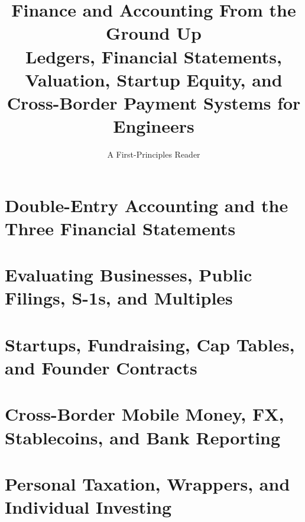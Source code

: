 \documentclass[11pt,oneside]{book}
\title{\textbf{Finance and Accounting From the Ground Up}\\[0.4em]
\large Ledgers, Financial Statements, Valuation, Startup Equity, and Cross-Border Payment Systems for Engineers}
\author{A First-Principles Reader}
\date{}
\begin{document}
\frontmatter
\maketitle
\tableofcontents



\mainmatter

\part{Double-Entry Accounting and the Three Financial Statements}



\part{Evaluating Businesses, Public Filings, S-1s, and Multiples}



\part{Startups, Fundraising, Cap Tables, and Founder Contracts}



\part{Cross-Border Mobile Money, FX, Stablecoins, and Bank Reporting}





\part{Personal Taxation, Wrappers, and Individual Investing}

\end{document}
